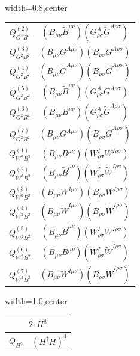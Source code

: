 \begin{table}[H]
\begin{center}
\begin{adjustbox}{width=0.8\textwidth,center}
\begin{minipage}[t]{5cm}
\begin{tabular}[t]{c|c}
%
$Q_{G^2B^2}^{(2)}$  &  $(B_{\mu\nu} \widetilde{B}^{\mu\nu}) (G_{\rho\sigma}^A \widetilde{G}^{A\rho\sigma})$ \\
%
$Q_{G^2B^2}^{(3)}$  &  $(B_{\mu\nu} G^{A\mu\nu}) (B_{\rho\sigma} G^{A\rho\sigma})$ \\
%
$Q_{G^2B^2}^{(4)}$  &  $(B_{\mu\nu} \widetilde{G}^{A\mu\nu}) (B_{\rho\sigma} \widetilde{G}^{A\rho\sigma})$ \\
%
$Q_{G^2B^2}^{(5)}$  &  $(B_{\mu\nu} \widetilde{B}^{\mu\nu}) (G_{\rho\sigma}^A G^{A\rho\sigma})$ \\
%
$Q_{G^2B^2}^{(6)}$  &  $(B_{\mu\nu} B^{\mu\nu}) (G_{\rho\sigma}^A \widetilde{G}^{A\rho\sigma})$ \\
%
$Q_{G^2B^2}^{(7)}$  &  $(B_{\mu\nu} G^{A\mu\nu}) (B_{\rho\sigma} \widetilde{G}^{A\rho\sigma})$ \\
%
$Q_{W^2B^2}^{(1)}$  &  $(B_{\mu\nu} B^{\mu\nu}) (W_{\rho\sigma}^I W^{I\rho\sigma})$ \\
%
$Q_{W^2B^2}^{(2)}$  &  $(B_{\mu\nu} \widetilde{B}^{\mu\nu}) (W_{\rho\sigma}^I \widetilde{W}^{I\rho\sigma})$ \\
%
$Q_{W^2B^2}^{(3)}$  &  $(B_{\mu\nu} W^{I\mu\nu}) (B_{\rho\sigma} W^{I\rho\sigma})$ \\
%
$Q_{W^2B^2}^{(4)}$  &  $(B_{\mu\nu} \widetilde{W}^{I\mu\nu}) (B_{\rho\sigma} \widetilde{W}^{I\rho\sigma})$ \\
%
$Q_{W^2B^2}^{(5)}$  &  $(B_{\mu\nu} \widetilde{B}^{\mu\nu}) (W_{\rho\sigma}^I W^{I\rho\sigma})$ \\
%
$Q_{W^2B^2}^{(6)}$  &  $(B_{\mu\nu} B^{\mu\nu}) (W_{\rho\sigma}^I \widetilde{W}^{I\rho\sigma})$ \\
%
$Q_{W^2B^2}^{(7)}$  &  $(B_{\mu\nu} W^{I\mu\nu}) (B_{\rho\sigma} \widetilde{W}^{I\rho\sigma})$
\end{tabular}
\end{minipage}
\end{adjustbox}
\begin{adjustbox}{width=1.0\textwidth,center}
\small
\begin{minipage}[t]{2.4cm}
\renewcommand{\arraystretch}{1.5}
\begin{tabular}[t]{c|c}
\multicolumn{2}{c}{\boldmath$2:H^8$} \\
\hline
$Q_{H^8}$  &  $(H^\dag H)^4$ 
\end{tabular}
\end{minipage}
\hspace{1cm}
\begin{minipage}[t]{5.6cm}

\end{minipage}
\end{adjustbox}
\end{center}
\end{table}
